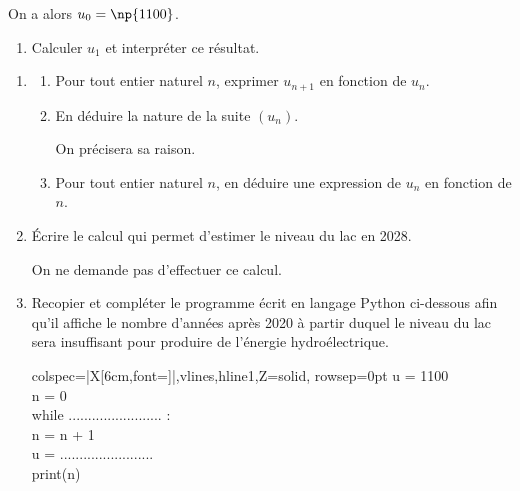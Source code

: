 	\begin{minipage}{0.7\linewidth}
		On a alors $u_0 = \np{1100}$.

	\begin{enumerate}
		\item Calculer $u_1$ et interpréter ce résultat.
	\end{enumerate}
	\end{minipage}\hfill
		\begin{enumerate}[start=2]
			\item
		\begin{enumerate}
			\item Pour tout entier naturel $n$, exprimer $u_{n+1}$ en fonction de $u_n$.

			\item En déduire la nature de la suite $(u_n)$.

			On précisera sa raison.

			\item Pour tout entier naturel $n$, en déduire une expression de $u_n$ en fonction de $n$.
		\end{enumerate}

		\item Écrire le calcul qui permet d'estimer le niveau du lac en 2028.

		On ne demande pas d'effectuer ce calcul.

		\item Recopier et compléter le programme écrit en langage Python ci-dessous afin qu'il affiche le nombre d'années après 2020 à partir duquel le niveau du lac sera insuffisant pour produire de l'énergie hydroélectrique.

	\begin{center}
	\begin{tblr}{colspec={|X[6cm,font=\ttfamily]|},vlines,hline{1,Z}={solid}, rowsep=0pt}
		u = 1100\\
		n = 0\\
		while ........................ :\\
		\quad n = n + 1\\
		\quad u = ........................\\
		print(n)\\
	\end{tblr}
	\end{center}
	\end{enumerate}


